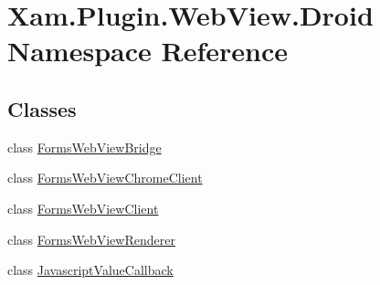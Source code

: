 \hypertarget{namespace_xam_1_1_plugin_1_1_web_view_1_1_droid}{}\section{Xam.\+Plugin.\+Web\+View.\+Droid Namespace Reference}
\label{namespace_xam_1_1_plugin_1_1_web_view_1_1_droid}
\subsection*{Classes}
\begin{DoxyCompactItemize}
\item 
class \hyperlink{class_xam_1_1_plugin_1_1_web_view_1_1_droid_1_1_forms_web_view_bridge}{Forms\+Web\+View\+Bridge}
\item 
class \hyperlink{class_xam_1_1_plugin_1_1_web_view_1_1_droid_1_1_forms_web_view_chrome_client}{Forms\+Web\+View\+Chrome\+Client}
\item 
class \hyperlink{class_xam_1_1_plugin_1_1_web_view_1_1_droid_1_1_forms_web_view_client}{Forms\+Web\+View\+Client}
\item 
class \hyperlink{class_xam_1_1_plugin_1_1_web_view_1_1_droid_1_1_forms_web_view_renderer}{Forms\+Web\+View\+Renderer}
\item 
class \hyperlink{class_xam_1_1_plugin_1_1_web_view_1_1_droid_1_1_javascript_value_callback}{Javascript\+Value\+Callback}
\end{DoxyCompactItemize}
